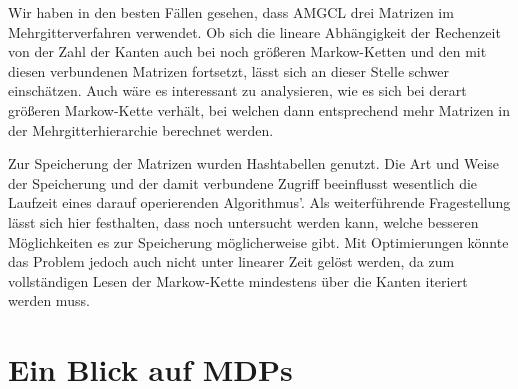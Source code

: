 \documentclass[a4paper]{article}
\newcommand{\mc}{Markow-Kette}
\theoremstyle{nonumberplain}
\begin{document}
Wir haben in den besten Fällen gesehen, dass AMGCL drei Matrizen im Mehrgitterverfahren verwendet. Ob sich die lineare Abhängigkeit der Rechenzeit von der Zahl der Kanten auch bei noch größeren \mc{}n und den mit diesen verbundenen Matrizen fortsetzt, lässt sich an dieser Stelle schwer einschätzen. Auch wäre es interessant zu analysieren, wie es sich bei derart größeren \mc{} verhält, bei welchen dann entsprechend mehr Matrizen in der Mehrgitterhierarchie berechnet werden.

Zur Speicherung der Matrizen wurden Hashtabellen genutzt. Die Art und Weise der Speicherung und der damit verbundene Zugriff beeinflusst wesentlich die Laufzeit eines darauf operierenden Algorithmus'. Als weiterführende Fragestellung lässt sich hier festhalten, dass noch untersucht werden kann, welche besseren Möglichkeiten es zur Speicherung möglicherweise gibt. Mit Optimierungen könnte das Problem jedoch auch nicht unter linearer Zeit gelöst werden, da zum vollständigen Lesen der \mc{} mindestens über die Kanten iteriert werden muss. 

\section{Ein Blick auf MDPs}
\end{document}
